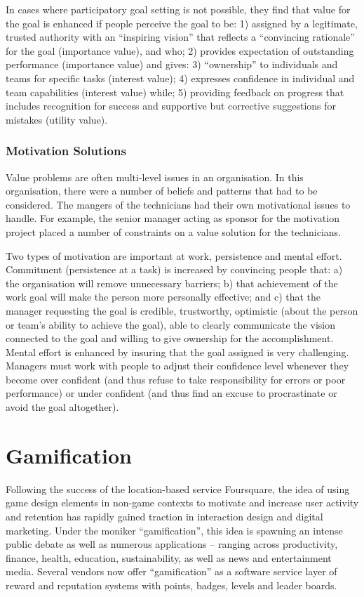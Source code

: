 In cases where participatory goal setting is not possible, they find that value for the goal is enhanced if people perceive the goal to be: 1) assigned by a legitimate, trusted authority with an ``inspiring vision'' that reflects a ``convincing rationale'' for the goal (importance value), and who; 2) provides expectation of outstanding performance (importance value) and gives: 3) ``ownership'' to individuals and teams for specific tasks (interest value); 4) expresses confidence in individual and team capabilities (interest value) while; 5) providing feedback on progress that includes recognition for success and supportive but corrective suggestions for mistakes (utility value).

\subsubsection{Motivation Solutions}

Value problems are often multi-level issues in an organisation. In this organisation, there were a number of beliefs and patterns that had to be considered. The mangers of the technicians had their own motivational issues to handle. For example, the senior manager acting as sponsor for the motivation project placed a number of constraints on a value solution for the technicians.

Two types of motivation are important at work, persistence and mental effort. Commitment (persistence at a task) is increased by convincing people that: a) the organisation will remove unnecessary barriers; b) that achievement of the work goal will make the person more personally effective; and c) that the manager requesting the goal is credible, trustworthy, optimistic (about the person or team’s ability to achieve the goal), able to clearly communicate the vision connected to the goal and willing to give ownership for the accomplishment. Mental effort is enhanced by insuring that the goal assigned is very challenging. Managers must work with people to adjust their confidence level whenever they become over confident (and thus refuse to take responsibility for errors or poor performance) or under confident (and thus find an excuse to procrastinate or avoid the goal altogether).

\section{Gamification}

Following the success of the location-based service Foursquare, the idea of using game design elements in non-game contexts to motivate and increase user activity and retention has rapidly gained traction in interaction design and digital marketing. Under the moniker ``gamification'', this idea is spawning an intense public debate as well as numerous applications – ranging across productivity, finance, health, education, sustainability, as well as news and entertainment media. Several vendors now offer ``gamification'' as a software service layer of reward and reputation systems with points, badges, levels and leader boards.

